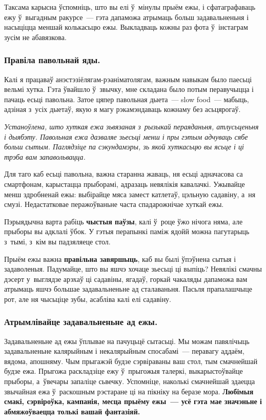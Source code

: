 Таксама карысна ўспомніць, што вы елі ў~мінулы прыём ежы, і сфатаграфаваць ежу ў~выгадным ракурсе~--- гэта дапаможа атрымаць больш задавальненьня і насыціцца меншай колькасьцю ежы. Выкладваць кожны раз фота ў~інстаграм зусім не абавязкова.


\subsubsection{Правіла павольнай яды.}
Калі я працаваў анэстэзіёлягам-рэаніматолягам, важным навыкам было паесьці вельмі хутка. Гэта ўвайшло ў~звычку, мне складана было потым перавучыцца і пачаць есьці павольна. Затое цяпер павольная дыета~--- slow food~--- мабыць, адзіная з~усіх дыетаў, якую я магу рэкамэндаваць кожнаму без асьцярогаў.

\emph{Устаноўлена, што хуткая ежа зьвязаная з~рызыкай пераяданьня, атлусьценьня і дыябэту. Павольная ежа дазваляе зьесьці менш і пры гэтым адчуваць сябе больш сытым. Паглядзіце па сэкундамэры, зь якой хуткасьцю вы ясьце і ці трэба вам запавольвацца.}

Для таго каб есьці павольна, важна старанна жаваць, ня есьці адначасова са смартфонам, карыстацца прыборамі, адразаць невялікія кавалачкі. Ужывайце менш здробненай ежы: выбірайце мяса замест катлетаў, цэльную садавіну, а~ня смузі. Недастатковае перажоўваньне часта спадарожнічае хуткай ежы.

Пэрыядычна варта рабіць \textbf{чыстыя паўзы}, калі ў~роце ўжо нічога няма, але прыборы вы адклалі ўбок. У гэтыя перапынкі паміж ядойй можна пагутарыць з~тымі, з~кім вы падзяляеце стол.

Прыём ежы важна \textbf{правільна завяршыць}, каб вы былі ўпэўнена сытыя і задаволеныя. Падумайце, што вы яшчэ хочаце зьесьці ці выпіць? Невялікі смачны дэсерт у~выглядзе арэхаў ці садавіны, ягадаў, горкай чакаляды дапаможа вам атрымаць яшчэ большае задавальненьне ад сталаваньня. Пасьля прапалашчыце рот, але ня чысьціце зубы, асабліва калі елі садавіну.

\subsubsection{Атрымлівайце задавальненьне ад ежы.}
Задавальненьне ад ежы ўплывае на пачуцьцё сытасьці. Мы можам павялічыць задавальненьне калярыйным і некалярыйным спосабамі~--- перавагу аддаём, вядома, апошняму. Чым прыгажэй будзе сэрвіраваны ваш стол, тым смачнейшай будзе ежа. Прыгожа раскладзіце ежу ў~прыгожыя талеркі, выкарыстоўвайце прыборы, а~ўвечары запаліце сьвечку. Успомніце, наколькі смачнейшай здаецца звычайная ежа ў~раскошным рэстаране ці на пікніку на беразе мора. \textbf{Любімыя смакі, сэрвіроўка, кампанія, месца прыёму ежы~--- усё гэта мае значэньне і абмяжоўваецца толькі вашай фантазіяй.}

